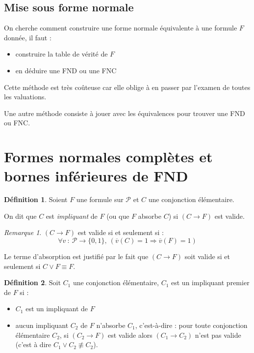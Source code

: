 \documentclass[]{article}
\theoremstyle{remark}
\newtheorem{myrem}{Remarque}
\theoremstyle{definition}
\newtheorem{mydef}{Définition}
\newcommand{\funcshort}[3]{
#1 ~ : ~ #2 \longrightarrow #3
}
\begin{document}
\subsection{Mise sous forme normale}

On cherche comment construire une forme normale équivalente à une formule $F$ donnée, il faut :
\begin{itemize}
	\item construire la table de vérité de $F$
	\item en déduire une FND ou une FNC
\end{itemize}

Cette méthode est très coûteuse car elle oblige à en passer par l'examen de toutes les valuations.

Une autre méthode consiste à jouer avec les équivalences pour trouver une FND ou FNC.

\section{Formes normales complètes et bornes inférieures de FND}

\begin{mydef}
	Soient $F$ une formule sur $\mathcal{P}$ et $C$ une conjonction élémentaire.
	
	On dit que $C$ est \textit{impliquant} de $F$ (ou que $F$ absorbe $C$) si $(C \rightarrow F)$ est valide.
\end{mydef}

\begin{myrem}
	$(C \rightarrow F)$ est valide si et seulement si :
	$$\forall \funcshort{v}{\mathcal{P}}{\{0, 1\}}, ~ (\overline{v}(C) = 1 \Longrightarrow \overline{v}(F)=1)$$
\end{myrem}

Le terme d'absorption est justifié par le fait que $(C \rightarrow F)$ soit valide si et seulement si $C \lor F \equiv F$.

\begin{mydef}
	Soit $C_1$ une conjonction élémentaire, $C_1$ est un impliquant premier de $F$ si :
	\begin{itemize}
		\item $C_1$ est un impliquant de $F$
		\item aucun impliquant $C_2$ de $F$ n'absorbe $C_1$, c'est-à-dire : pour toute conjonction élémentaire $C_2$, si $(C_2 \rightarrow F)$ est valide alors $(C_1 \rightarrow C_2)$ n'est pas valide (c'est à dire $C_1 \lor C_2 \not\equiv C_2$).
	\end{itemize}
\end{mydef}
\end{document}
